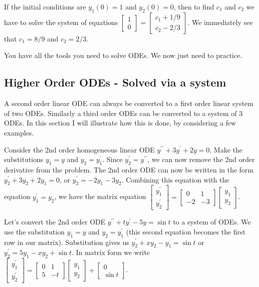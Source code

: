 If the initial conditions are  $y_1(0)=1$ and $y_2(0)=0$, then to find $c_1$ and $c_2$ we have to solve the system of equations
$
\begin{bmatrix}
1\\
0
\end{bmatrix}
=
\begin{bmatrix}
c_1+1/9\\
c_2-2/3
\end{bmatrix}
$.  We immediately see that $c_1=8/9$ and $c_2=2/3$.

You have all the tools you need to solve ODEs. We now just need to practice.






\subsection{Higher Order ODEs - Solved via a system}
A second order linear ODE can always be converted to a first order linear system of two ODEs.  Similarly a third order ODEs can be converted to a system of 3 ODEs.  In this section I will illustrate how this is done, by considering a few examples.  

Consider the 2nd order homogeneous linear ODE $y^{\prime\prime} +3y^\prime+2y=0$.  Make the substitutions $y_1 = y$ and $y_2=y_1^\prime$.  Since $y_2^\prime = y^{\prime\prime}$, we can now remove the 2nd order derivative from the problem. The 2nd order ODE can now be written in the form $y_2^\prime +3y_2+2y_1=0$, or $y_2^\prime = -2y_1 - 3y_2$.  Combining this equation with the equation $y_1^\prime = y_2$, we have the matrix equation 
$
\begin{bmatrix}
y_1^\prime\\
y_2^\prime
\end{bmatrix}
=
\begin{bmatrix}
0&1\\
-2&-3
\end{bmatrix}
\begin{bmatrix}
y_1\\
y_2
\end{bmatrix}
$.

Let's convert the 2nd order ODE $y^{\prime\prime} +ty^\prime-5y=\sin t$ to a system of ODEs.  We use the substitution $y_1=y$ and $y_2=y_1^\prime$ (this second equation becomes the first row in our matrix). Substitution gives us $y_2^\prime+xy_2-y_1=\sin t$ or $y_2^\prime = 5y_1-xy_2+\sin t$.  In matrix form  we write 
$
\begin{bmatrix}
y_1^\prime\\
y_2^\prime
\end{bmatrix}
=
\begin{bmatrix}
0&1\\
5&-t
\end{bmatrix}
\begin{bmatrix}
y_1\\
y_2
\end{bmatrix}
+
\begin{bmatrix}
0\\
\sin t
\end{bmatrix}
$.

